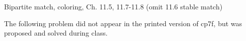 \documentclass[handout]{mcs}
\begin{document}

\begin{staffnotes}
Bipartite match, coloring, Ch. 11.5, 11.7-11.8 (omit 11.6 stable match)
\end{staffnotes}





\begin{staffnotes}
The following problem did not appear in the printed version of cp7f,
but was proposed and solved during class.
\end{staffnotes}



\end{document}
